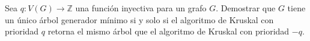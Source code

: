 
 \item Sea $q\colon V(G) \to \mathbb{Z}$ una función inyectiva para un grafo $G$.  Demostrar que $G$ tiene un único árbol generador mínimo si y solo si el algoritmo de Kruskal con prioridad $q$ retorna el mismo árbol que el algoritmo de Kruskal con prioridad $-q$.

